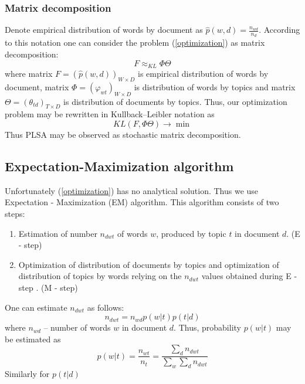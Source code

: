 \documentclass{article}
\begin{document}
            \subsubsection{Matrix decomposition}
                Denote empirical distribution of words by document as $\hat{p}(w, d) = \frac{n_{wd}}{n_d}$. 
                According to this notation one can consider the problem (\ref{optimization}) as matrix decomposition:
                \begin{equation} F \approx_{KL} \Phi \Theta \end{equation}
                where matrix $F = (\hat{p}(w, d))_{W \times D}$ is empirical distribution of words by document,
                matrix $\Phi = (\varphi_{wt})_{W \times D}$ is distribution of words by topics and 
                matrix  $\Theta = (\theta_{td})_{T\times D}$ is distribution of documents by topics. 
                Thus, our optimization problem may be rewritten in Kullback–Leibler notation as 
                \begin{equation} KL(F , \Phi \Theta) \rightarrow \min \end{equation}
                Thus PLSA may be observed as stochastic matrix decomposition. 
        
        \subsection{Expectation\--Maximization algorithm}
             Unfortunately (\ref{optimization}) has no analytical solution. Thus we use Expectation \-- Maximization (EM) algorithm.
             This algorithm consists of two steps:
                \begin{enumerate}
                    \item Estimation of number $n_{dwt}$ of words $w$, produced by topic $t$ in document $d$. (E \-- step)
                    \item Optimization of distribution of documents by topics and optimization of distribution of topics by words relying on
			the $n_{dwt}$ values obtained during E \-- step . (M \-- step)
                \end{enumerate}  
              One can estimate $n_{dwt}$ as follows:
              \begin{equation}  n_{dwt} = n_{wd} p(w|t) p(t|d) \end{equation} 
              where $n_{wd}$ \--- number of words $w$ in document $d$.
              Thus, probability $p(w|t)$ may be estimated as 
              \begin{equation}  p(w|t) = \frac{n_{wt}}{n_t} = \frac{\sum_d n_{dwt} }{\sum_w \sum_d n_{dwt}}   \end{equation} 
              Similarly for $p(t|d)$
        
\end{document}
